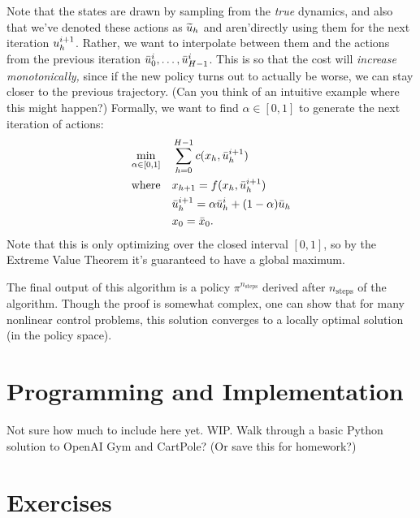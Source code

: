 \documentclass[../main/main]{subfiles}
\begin{document}
Note that the states are drawn by sampling from the \emph{true} dynamics,
and also that we've denoted these actions as $\widetilde {u}_h$ and aren'\hi directly using them for the next iteration $u^{i+1}_h$.
Rather, we want to interpolate between them and the actions from the previous iteration $\bar {u}^i_0, \dots, \bar {u}^i_{H-1}$.
This is so that the cost will \emph{increase monotonically,} since if the new policy turns out to actually be worse, we can stay closer to the previous trajectory. (Can you think of an intuitive example where this might happen?)
Formally, we want to find $\alpha \in [0, 1]$ to generate the next iteration of actions: \begin{align*}
    \min_{\alpha \in [0, 1]} \quad & \sum_{h=0}^{H-1} c(x_h, \bar {u}^{i+1}_h) \\
    \text{where} \quad & x_{h+1} = f(x_h, \bar {u}^{i+1}_h) \\
    & \bar {u}^{i+1}_h = \alpha \bar {u}^i_h + (1-\alpha) \bar {u}_h \\
    & x_0 = \bar {x}_0.
\end{align*}
Note that this is only optimizing over the closed interval $[0, 1]$, so by the Extreme Value Theorem it's guaranteed to have a global maximum.

The final output of this algorithm is a policy $\pi^{n_\text{steps}}$ derived after $n_\text{steps}$ of the algorithm.
Though the proof is somewhat complex, one can show that for many nonlinear control problems, this solution converges to a locally optimal solution (in the policy space).


\section{Programming and Implementation}

Not sure how much to include here yet. WIP. Walk through a basic Python solution
to OpenAI Gym and CartPole? (Or save this for homework?)



\section{Exercises}
\end{document}
